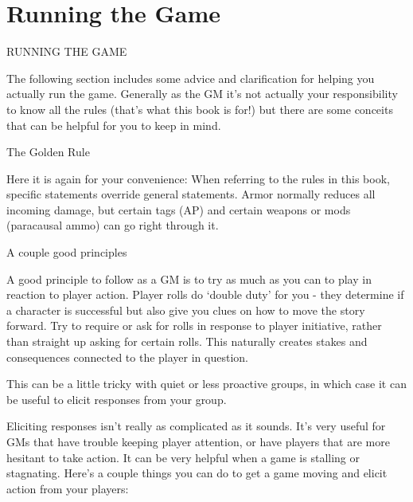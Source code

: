 \section{Running the Game}
RUNNING THE GAME  

The following section includes some advice and clarification for helping you actually run the  
game. Generally as the GM it’s not actually your responsibility to know all the rules (that’s what  
this book is for!) but there are some conceits that can be helpful for you to keep in mind.
 

                                            The Golden Rule  

Here it is again for your convenience: When referring to the rules in this book, specific  
statements override general statements. Armor normally reduces all incoming damage, but  
certain tags (AP) and certain weapons or mods (paracausal ammo) can go right through it.
 

                                       A couple good principles  

A good principle to follow as a GM is to try as much as you can to play in reaction to player  
action. Player rolls do ‘double duty’ for you - they determine if a character is successful but also  
give you clues on how to move the story forward. Try to require or ask for rolls in response to  
player initiative, rather than straight up asking for certain rolls. This naturally creates stakes and  
consequences connected to the player in question. 
 

This can be a little tricky with quiet or less proactive groups, in which case it can be useful to  
elicit responses from your group.
 

Eliciting responses isn’t really as complicated as it sounds. It’s very useful for GMs that have  
trouble keeping player attention, or have players that are more hesitant to take action. It can be  
very helpful when a game is stalling or stagnating. Here’s a couple things you can do to get a  
game moving and elicit action from your players:
 
